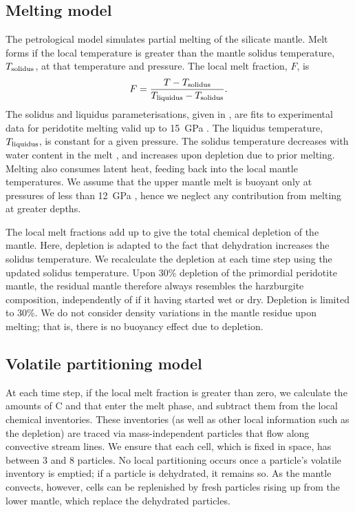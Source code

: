 \subsection{Melting model}
The petrological model simulates partial melting of the silicate mantle. Melt forms if the local temperature is greater than the mantle solidus temperature, $T_{\rm solidus}$, at that temperature and pressure. The local melt fraction, $F$, is
\begin{equation}\label{eq:melt-fraction}
    F = \frac{T - T_{\rm solidus}}{T_{\rm liquidus} - T_{\rm solidus}}.
\end{equation}
The solidus and liquidus parameterisations, given in \citet{noack2014can}, are fits to experimental data for peridotite melting valid up to 15~GPa \citep{smet1999evolution}. The liquidus temperature, $T_{\rm liquidus}$, is constant for a given pressure. The solidus temperature decreases with water content in the melt \citep{katz_new_2003}, and increases upon depletion due to prior melting. Melting also consumes latent heat, feeding back into the local mantle temperatures. We assume that the upper mantle melt is buoyant only at pressures of less than 12~GPa \citep{ohtani_melting_1995}, hence we neglect any contribution from melting at greater depths. 

The local melt fractions add up to give the total chemical depletion of the mantle. Here, depletion is adapted to the fact that dehydration increases the solidus temperature. We recalculate the depletion at each time step using the updated solidus temperature. Upon 30\% depletion of the primordial peridotite mantle, the residual mantle therefore always resembles the harzburgite composition, independently of if it having started wet or dry. Depletion is limited to 30\%. We do not consider density variations in the mantle residue upon melting; that is, there is no buoyancy effect due to depletion.



\subsection{Volatile partitioning model}\label{sec:partitioning-methods}

At each time step, if the local melt fraction is greater than zero, we calculate the amounts of C and  that enter the melt phase, and subtract them from the local chemical inventories. These inventories (as well as other local information such as the depletion) are traced via mass-independent particles that flow along convective stream lines. We ensure that each cell, which is fixed in space, has between 3 and 8 particles. No local partitioning occurs once a particle's volatile inventory is emptied; if a particle is dehydrated, it remains so. As the mantle convects, however, cells can be replenished by fresh particles rising up from the lower mantle, which replace the dehydrated particles. 

